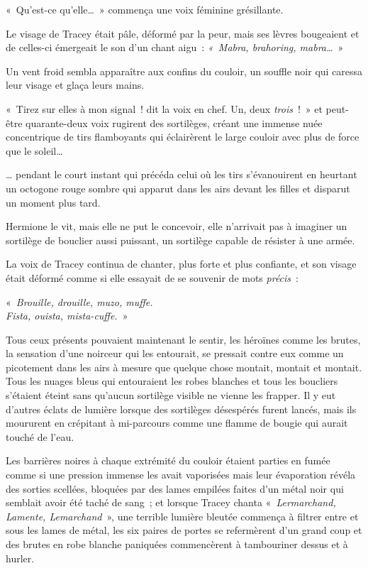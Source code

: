 «~Qu'est-ce qu'elle…~» commença une voix féminine grésillante.

Le visage de Tracey était pâle, déformé par la peur, mais ses lèvres bougeaient et de celles-ci émergeait le son d'un chant aigu~: \emph{«~Mabra, brahoring, mabra…}~»

Un vent froid sembla apparaître aux confins du couloir, un souffle noir qui caressa leur visage et glaça leurs mains.

«~Tirez sur elles à mon signal~! dit la voix en chef. Un, deux \emph{trois}~!~» et peut-être quarante-deux voix rugirent des sortilèges, créant une immense nuée concentrique de tirs flamboyants qui éclairèrent le large couloir avec plus de force que le soleil…

… pendant le court instant qui précéda celui où les tirs s'évanouirent en heurtant un octogone rouge sombre qui apparut dans les airs devant les filles et disparut un moment plus tard.

Hermione le vit, mais elle ne put le concevoir, elle n'arrivait pas à imaginer un sortilège de bouclier aussi puissant, un sortilège capable de résister à une armée.

La voix de Tracey continua de chanter, plus forte et plus confiante, et son visage était déformé comme si elle essayait de se souvenir de mots \emph{précis}~:

«~\emph{Brouille, drouille, muzo, muffe.\\
Fista, ouista, mista-cuffe.}~»

Tous ceux présents pouvaient maintenant le sentir, les héroïnes comme les brutes, la sensation d'une noirceur qui les entourait, se pressait contre eux comme un picotement dans les airs à mesure que quelque chose montait, montait et montait. Tous les nuages bleus qui entouraient les robes blanches et tous les boucliers s'étaient éteint sans qu'aucun sortilège visible ne vienne les frapper. Il y eut d'autres éclats de lumière lorsque des sortilèges désespérés furent lancés, mais ils moururent en crépitant à mi-parcours comme une flamme de bougie qui aurait touché de l'eau.

Les barrières noires à chaque extrémité du couloir étaient parties en fumée comme si une pression immense les avait vaporisées mais leur évaporation révéla des sorties scellées, bloquées par des lames empilées faites d'un métal noir qui semblait avoir été taché de sang~; et lorsque Tracey chanta «~\emph{Lermarchand, Lamente, Lemarchand}~», une terrible lumière bleutée commença à filtrer entre et sous les lames de métal, les six paires de portes se refermèrent d'un grand coup et des brutes en robe blanche paniquées commencèrent à tambouriner dessus et à hurler.

